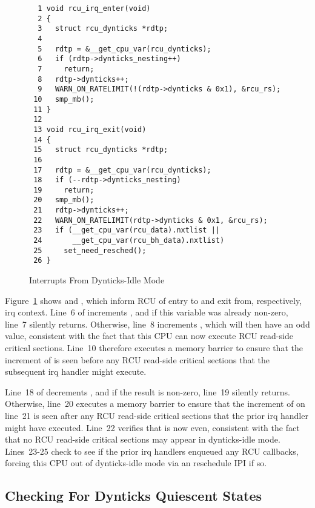\begin{figure}[tbp]
{ \scriptsize
\begin{verbatim}
  1 void rcu_irq_enter(void)
  2 {
  3   struct rcu_dynticks *rdtp;
  4
  5   rdtp = &__get_cpu_var(rcu_dynticks);
  6   if (rdtp->dynticks_nesting++)
  7     return;
  8   rdtp->dynticks++;
  9   WARN_ON_RATELIMIT(!(rdtp->dynticks & 0x1), &rcu_rs);
 10   smp_mb();
 11 }
 12
 13 void rcu_irq_exit(void)
 14 {
 15   struct rcu_dynticks *rdtp;
 16
 17   rdtp = &__get_cpu_var(rcu_dynticks);
 18   if (--rdtp->dynticks_nesting)
 19     return;
 20   smp_mb();
 21   rdtp->dynticks++;
 22   WARN_ON_RATELIMIT(rdtp->dynticks & 0x1, &rcu_rs);
 23   if (__get_cpu_var(rcu_data).nxtlist ||
 24       __get_cpu_var(rcu_bh_data).nxtlist)
 25     set_need_resched();
 26 }
\end{verbatim}
}
\caption{Interrupts From Dynticks-Idle Mode}
\label{fig:app:formal:Interrupts From Dynticks-Idle Mode}
\end{figure}

Figure~\ref{fig:app:formal:Interrupts From Dynticks-Idle Mode}
shows  and , which
inform RCU of entry to and exit from, respectively, irq context.
Line~6 of  increments ,
and if this variable was already non-zero, line~7 silently returns.
Otherwise, line~8 increments , which will then have
an odd value, consistent with the fact that this CPU can now
execute RCU read-side critical sections.
Line~10 therefore executes a memory barrier to ensure that
the increment of  is seen before any
RCU read-side critical sections that the subsequent irq handler
might execute.

Line~18 of  decrements , and
if the result is non-zero, line~19 silently returns.
Otherwise, line~20 executes a memory barrier to ensure that the
increment of  on line~21 is seen after any RCU
read-side critical sections that the prior irq handler might have executed.
Line~22 verifies that  is now even, consistent with
the fact that no RCU read-side critical sections may appear in
dynticks-idle mode.
Lines~23-25 check to see if the prior irq handlers enqueued any
RCU callbacks, forcing this CPU out of dynticks-idle mode via
an reschedule IPI if so.

\subsection{Checking For Dynticks Quiescent States}
\label{app:formal:Checking For Dynticks Quiescent States}

